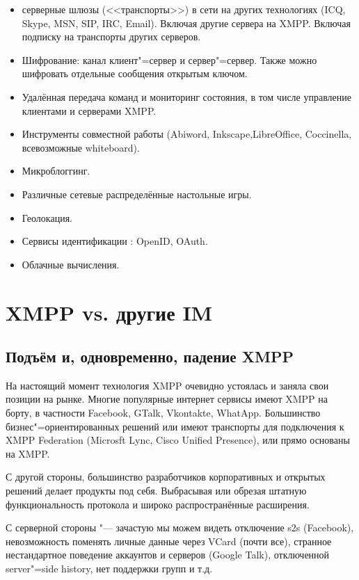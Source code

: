 \documentclass[10pt, a5paper]{article}
\begin{document}
\begin{itemize}
  \item серверные шлюзы (<<транспорты>>) в сети на других технологиях (ICQ, Skype, MSN, SIP, IRC, Email). Включая другие сервера на XMPP. Включая подписку на транспорты других серверов.
  \item Шифрование: канал клиент"=сервер и сервер"=сервер. Также \linebreak можно шифровать отдельные сообщения открытым ключом.
  \item Удалённая передача команд и мониторинг состояния, в том числе управление клиентами и серверами XMPP.
  \item Инструменты совместной работы (Abiword, Inkscape,\linebreak LibreOffice, Coccinella, всевозможные whiteboard).
  \item Микроблоггинг.
  \item Различные сетевые распределённые настольные игры.
  \item Геолокация.
  \item Сервисы идентификации : OpenID, OAuth.
  \item Облачные вычисления.
\end{itemize}

\section*{XMPP vs. другие IM}

\subsection*{Подъём и, одновременно, падение XMPP}

На настоящий момент технология  XMPP очевидно устоялась и заняла свои позиции на рынке. Многие популярные интернет сервисы имеют XMPP на борту, в частности Facebook, GTalk, Vkontakte, WhatApp. Большинство бизнес"=ориентированных решений или имеют транспорты для подключения к XMPP Federation (Microsft Lync, Cisco Unified Presence), или прямо основаны на XMPP.

С другой стороны, большинство разработчиков корпоративных и открытых решений делает продукты под себя.  Выбрасывая или обрезая штатную функциональность протокола и широко распространённые расширения.

С серверной стороны "--- зачастую мы можем видеть отключение s2s (Facebook), невозможность поменять личные данные через VCard (почти все), странное нестандартное поведение аккаунтов и серверов (Google Talk), отключенной server"=side history, нет поддержки групп  и т.д.
\end{document}

